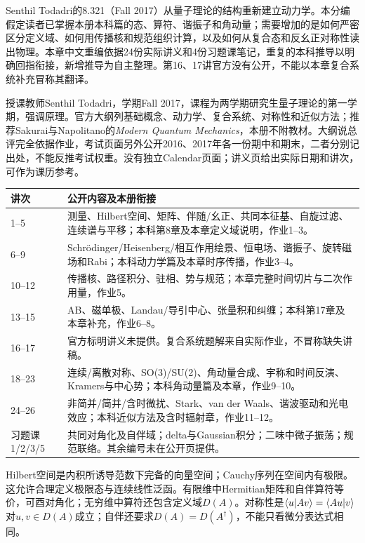 \label{ch:graduate321}
Senthil Todadri的8.321（Fall 2017）从量子理论的结构重新建立动力学。本分编假定读者已掌握本册本科篇的态、算符、谐振子和角动量；需要增加的是如何严密区分定义域、如何用传播核和规范组织计算，以及如何从复合态和反幺正对称性读出物理。本章中文重编依据24份实际讲义和4份习题课笔记，重复的本科推导以明确回指衔接，新增推导为自主整理。第16、17讲官方没有公开，不能以本章复合系统补充冒称其翻译。

授课教师Senthil Todadri，学期Fall 2017，课程为两学期研究生量子理论的第一学期，强调原理。官方大纲列基础概念、动力学、复合系统、对称性和近似方法；推荐Sakurai与Napolitano的\textit{Modern Quantum Mechanics}，本册不附教材。大纲说总评完全依据作业，考试页面另外公开2016、2017年各一份期中和期末，二者分别记出处，不能反推考试权重。没有独立Calendar页面；讲义页给出实际日期和讲次，可作为课历参考。
\begin{longtable}{p{}p{}}
\toprule 讲次 & 公开内容及本册衔接\\\midrule\endhead
1--5 & 测量、Hilbert空间、矩阵、伴随/幺正、共同本征基、自旋过滤、连续谱与平移；本科第8章及本章定义域说明，作业1--3。\\
6--9 & Schrödinger/Heisenberg/相互作用绘景、恒电场、谐振子、旋转磁场和Rabi；本科动力学篇及本章时序传播，作业3--4。\\
10--12 & 传播核、路径积分、驻相、势与规范；本章完整时间切片与二次作用量，作业5。\\
13--15 & AB、磁单极、Landau/导引中心、张量积和纠缠；本科第17章及本章补充，作业6--8。\\
16--17 & 官方标明讲义未提供。复合系统题解来自实际作业，不冒称缺失讲稿。\\
18--23 & 连续/离散对称、SO(3)/SU(2)、角动量合成、宇称和时间反演、Kramers与中心势；本科角动量篇及本章，作业9--10。\\
24--26 & 非简并/简并/含时微扰、Stark、van der Waals、谐波驱动和光电效应；本科近似方法及含时辐射章，作业11--12。\\
习题课1/2/3/5 & 共同对角化及自伴域；delta与Gaussian积分；二味中微子振荡；规范联络。其余编号未在公开页提供。\\
\bottomrule
\end{longtable}

Hilbert空间是内积所诱导范数下完备的向量空间；Cauchy序列在空间内有极限。这允许合理定义极限态与连续线性泛函。有限维中Hermitian矩阵和自伴算符等价，可酉对角化；无穷维中算符还包含定义域$D(A)$。对称性是$\langle u\vert Av\rangle=\langle Au\vert v\rangle$对$u,v\in D(A)$成立；自伴还要求$D(A)=D(A^\dagger)$，不能只看微分表达式相同。

